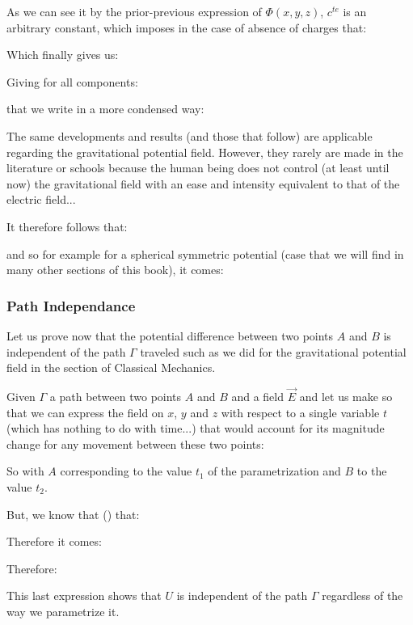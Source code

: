 	As we can see it by the prior-previous expression of $\Phi(x,y,z)$, $c^{te}$ is an arbitrary constant, which imposes in the case of absence of charges that:
	
	Which finally gives us:
	
	Giving for all components:
	
	that we write in a more condensed way\label{derivation of electric field by the potential}:
	
	\begin{tcolorbox}[title=Remark,colframe=black,arc=10pt]
	The same developments and results (and those that follow) are applicable regarding the gravitational potential field. However, they rarely are made in the literature or schools because the human being does not control (at least until now) the gravitational field with an ease and intensity equivalent to that of the electric field...
	\end{tcolorbox}
	It therefore follows that:
	
	and so for example for a spherical symmetric potential (case that we will find in many other sections of this book), it comes:
	
	
	\pagebreak
	\subsubsection{Path Independance}
	Let us prove now that the potential difference between two points $A$ and $B$ is independent of the path $\Gamma$ traveled such as we did for the gravitational potential field in the section of Classical Mechanics.

	Given $\Gamma$ a path between two points $A$ and $B$ and a field $\vec{E}$ and let us make so that we can express the field on $x$, $y$ and $z$ with respect to a single variable $t$ (which has nothing to do with time...) that would account for its magnitude change for  any movement between these two points:
	
	So with $A$ corresponding to the value $t_1$ of the parametrization and $B$ to the value $t_2$. 
	
	But, we know that () that:
	
	Therefore it comes:
	
	Therefore:
	
	This last expression shows that $U$ is independent of the path $\Gamma$ regardless of the way we parametrize it.
	
